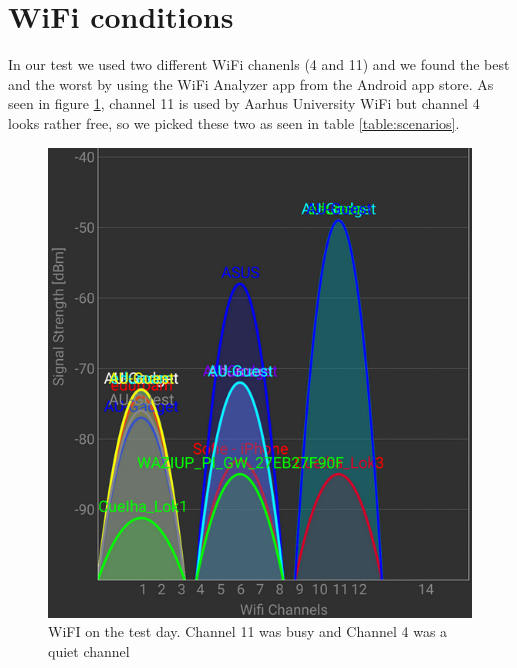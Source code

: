 \section{WiFi conditions}\label{sc:wifi}
In our test we used two different WiFi chanenls (4 and 11) and we found the best and the worst by using the WiFi Analyzer app from the Android app store\cite{Farproc@gmail.com2018}. As seen in figure \ref{fig:wifionthetestday}, channel 11 is used by Aarhus University WiFi but channel 4 looks rather free, so we picked these two as seen in table \ref{table:scenarios}.

\begin{figure}[h]
	\centering
	\includegraphics[width=0.6\linewidth]{testAndPerformance/wifi/wifiOnTheTestDay}
	\caption{WiFI on the test day. Channel 11 was busy and Channel 4 was a quiet channel}
	\label{fig:wifionthetestday}
\end{figure}
